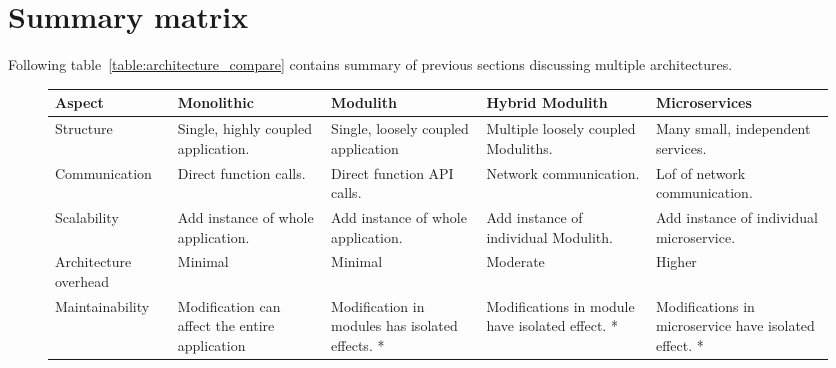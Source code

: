 \section{Summary matrix}
Following table~\ref{table:architecture_compare} contains summary of previous sections discussing multiple architectures.


\begin{sidewaysfigure}
    \begin{tabular}{ |p{2.7cm}|p{3cm}|p{3cm}|p{4cm}|p{3cm}| }
        \hline
        \textbf{Aspect}       & \textbf{Monolithic}                            & \textbf{Modulith}                                 & \textbf{Hybrid Modulith}                                                            & \textbf{Microservices}                                                                        \\
        \hline
        Structure             & Single, highly coupled   application.          & Single, loosely coupled application               & Multiple loosely coupled Moduliths.                                                 & Many small, independent services.                                                             \\
        \hline
        Communication         & Direct function calls.                         & Direct function API calls.                        & Network communication.                                                              & Lof of network communication.                                                                 \\
        \hline
        Scalability           & Add instance of whole application.             & Add instance of whole application.                & Add instance of individual Modulith.                                                & Add instance of individual microservice.                                                      \\
        \hline
        Architecture overhead & Minimal                                        & Minimal                                           & Moderate                                                                            & Higher                                                                                        \\
        \hline
        Maintainability       & Modification can affect the entire application & Modification in modules has isolated effects. *   & Modifications in module have isolated effect. *                                     & Modifications in microservice have isolated effect. *                                         \\

\end{tabular}
\end{sidewaysfigure}
